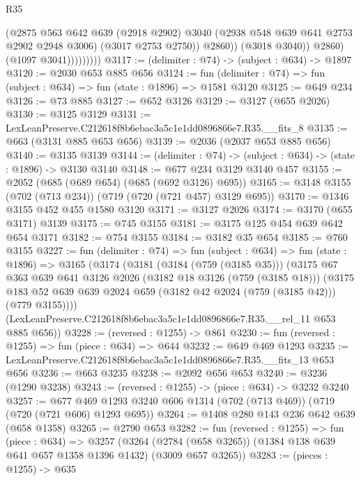 \begin{lexlean}{R35}
\begin{coremodule}
                            (@2875
                              @563
                              @642
                              @639
                              (@2918 @2902)
                              @3040
                              (@2938 @548 @639 @641 @2753 @2902 @2948 @3006)
                              (@3017 @2753 @2750))
                            @2860))
                        (@3018 @3040))
                      @2860)
                    (@1097 @3041)))))))))
@3117 := (delimiter : @74) -> (subject : @634) -> @1897
@3120 := @2030 @653 @885 @656
@3124 := fun (delimiter : @74) => fun (subject : @634) => fun (state : @1896) => @1581 @3120
@3125 := @649 @234
@3126 := @73 @885
@3127 := @652 @3126
@3129 := @3127 (@655 @2026)
@3130 := @3125 @3129
@3131 := LexLeanPreserve.C212618f8b6ebac3a5c1e1dd0896866e7.R35.__fits_8
@3135 := @663 (@3131 @885 @653 @656)
@3139 := @2036 (@2037 @653 @885 @656)
@3140 := @3135 @3139
@3144 := (delimiter : @74) -> (subject : @634) -> (state : @1896) -> @3130 @3140
@3148 := @677 @234 @3129 @3140 @457
@3155 := @2052 (@685 (@689 @654) (@685 (@692 @3126) @695))
@3165 := @3148 @3155 (@702 (@713 @234)) (@719 (@720 (@721 @457) @3129 @695))
@3170 := @1346 @3155 @452 @455 @1580 @3120
@3171 := @3127 @2026
@3174 := @3170 (@655 @3171) @3139
@3175 := @745 @3155
@3181 := @3175 @125 @454 @639 @642 @654 @3171
@3182 := @754 @3155
@3184 := @3182 @35 @654
@3185 := @760 @3155
@3227 := fun (delimiter : @74) =>
  fun (subject : @634) =>
  fun (state : @1896) =>
  @3165
    (@3174
      (@3181
        (@3184 (@759 (@3185 @35)))
        (@3175
          @67
          @363
          @639
          @641
          @3126
          @2026
          (@3182 @18 @3126 (@759 (@3185 @18)))
          (@3175 @183 @52 @639 @639 @2024 @659 (@3182 @42 @2024 (@759 (@3185 @42))) (@779 @3155))))
      (LexLeanPreserve.C212618f8b6ebac3a5c1e1dd0896866e7.R35.__rel_11 @653 @885 @656))
@3228 := (reversed : @1255) -> @861
@3230 := fun (reversed : @1255) => fun (piece : @634) => @644
@3232 := @649 @469 @1293
@3235 := LexLeanPreserve.C212618f8b6ebac3a5c1e1dd0896866e7.R35.__fits_13 @653 @656
@3236 := @663 @3235
@3238 := @2092 @656 @653
@3240 := @3236 (@1290 @3238)
@3243 := (reversed : @1255) -> (piece : @634) -> @3232 @3240
@3257 := @677 @469 @1293 @3240 @606 @1314 (@702 (@713 @469)) (@719 (@720 (@721 @606) @1293 @695))
@3264 := @1408 @280 @143 @236 @642 @639 (@658 @1358)
@3265 := @2790 @653
@3282 := fun (reversed : @1255) =>
  fun (piece : @634) =>
  @3257
    (@3264 (@2784 (@658 @3265)) (@1384 @138 @639 @641 @657 @1358 @1396 @1432) (@3009 @657 @3265))
@3283 := (pieces : @1255) -> @635

\end{coremodule}
\end{lexlean}
